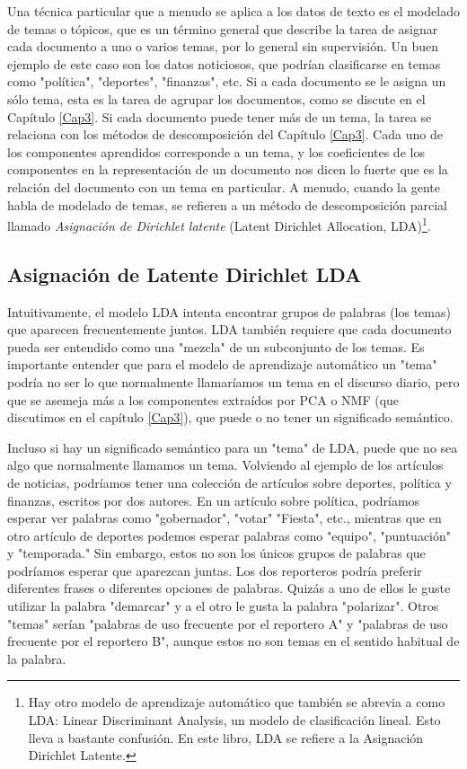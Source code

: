 Una técnica particular que a menudo se aplica a los datos de texto es el
 modelado de temas o tópicos, que es un término general  que describe la tarea de 
 asignar cada documento a uno o varios temas, por lo general sin supervisión. 
 Un buen ejemplo de este caso  son los datos noticiosos, que podrían clasificarse en
 temas como "política", "deportes", "finanzas", etc. Si a cada documento se le 
 asigna un sólo tema, esta es la tarea de agrupar los documentos, como se discute
 en el Capítulo \ref{Cap3}. 
Si cada documento puede tener más de un tema,  
la tarea se relaciona con los métodos de descomposición del Capítulo \ref{Cap3}.  Cada uno de los componentes  aprendidos  corresponde a un tema, y los coeficientes de los componentes en la representación de un documento nos dicen lo fuerte que es  la  relación del documento con un tema en particular. A menudo, cuando la gente habla de modelado de temas, se refieren a un método de descomposición parcial llamado \emph{Asignación de Dirichlet latente} (Latent Dirichlet Allocation, LDA)\footnote{Hay otro modelo de aprendizaje automático que también se abrevia a como LDA: Linear Discriminant Analysis, un modelo de clasificación lineal. Esto lleva a bastante confusión. En este libro, LDA se refiere a la Asignación Dirichlet Latente.}.


\subsection{Asignación de Latente  Dirichlet  LDA} 

Intuitivamente, el modelo LDA intenta encontrar grupos de palabras (los temas) que aparecen frecuentemente juntos. LDA también requiere que cada documento pueda ser entendido como una "{}mezcla"{}  de un subconjunto de los temas. Es importante entender que para el modelo de aprendizaje automático un "{}tema"{} podría no ser lo que normalmente llamaríamos un tema en el discurso diario, pero que se asemeja más a los componentes extraídos por  PCA  o  NMF (que discutimos en el capítulo \ref{Cap3}), que puede o no tener un significado semántico.

Incluso si hay un significado semántico para un "{}tema"{ }  de  LDA, puede que no sea algo que normalmente llamamos un tema.   Volviendo al ejemplo de los artículos de noticias, podríamos
tener  una colección de artículos sobre deportes, política y finanzas, escritos por dos
autores. En un artículo sobre política, podríamos esperar ver palabras como "{}gobernador"{}, "{}votar"{}
"{}Fiesta"{}, etc., mientras que en otro artículo de deportes podemos esperar palabras como "{}equipo"{}, "{}puntuación"{}  y  "{}temporada."{} 
Sin embargo, estos no son los únicos grupos de palabras que podríamos esperar que aparezcan juntas.
Los dos reporteros podría preferir diferentes frases o diferentes opciones de palabras. 
 Quizás a uno de ellos le guste utilizar la palabra "{}demarcar"{} y a el otro le gusta la palabra "{}polarizar"{}.  Otros "{}temas"{} serían "{}palabras de uso frecuente por el reportero A"{}  y  "{}palabras de uso frecuente por el reportero B"{},  aunque estos no son temas en el sentido habitual de la palabra. \\


